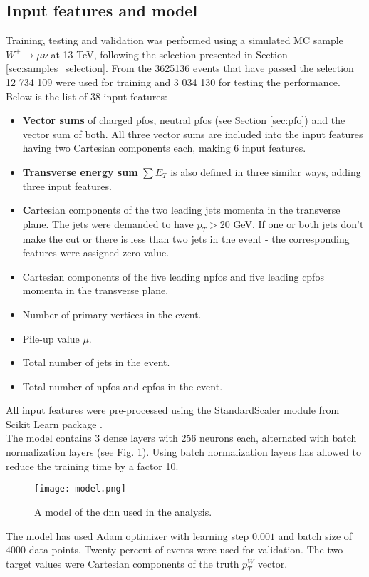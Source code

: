 \subsection{Input features and model}
 Training, testing and validation was performed using a simulated MC sample $W^+\rightarrow\mu\nu$ at 13 TeV, following the selection presented in Section \ref{sec:samples_selection}. From the 3625136 events that have passed the selection 12 734 109 were used for training and 3 034 130 for testing the performance. 
 Below is the list of 38 input features: 
 \begin{itemize}
 \item \textbf{Vector sums} of charged \gls{pfos}, neutral \gls{pfos} (see Section \ref{sec:pfo}) and the vector sum of both. All three vector sums are included into the input features having two Cartesian components each, making 6 input features. 
 \item \textbf{Transverse energy sum} $\sum E_T$ is also defined in three similar ways, adding three input features.
 \item \textbf Cartesian components of the {two leading jets} momenta in the transverse plane. The jets were demanded to have $p_T>20$ GeV. If one or both jets don't make the cut or there is less than two jets in the event - the corresponding features were assigned zero value. 
 \item Cartesian components of the {five leading \gls{npfos} and five leading \gls{cpfos}} momenta in the transverse plane. 
 \item Number of primary vertices in the event.
 \item Pile-up value $\mu$.
 \item Total number of jets in the event.
 \item Total number of \gls{npfos} and \gls{cpfos} in the event.
\end{itemize}
All input features were pre-processed using the StandardScaler module from Scikit Learn package \cite{scikit-learn}.\\
The model contains 3 dense layers with 256 neurons each, alternated with batch normalization layers (see Fig. \ref{fig::nnmodel}). Using batch normalization layers has allowed to reduce the training time by a factor 10. 
\begin{figure}[htpb]
	\centering
	\texttt{[image: model.png]}
	\caption{A model of the \gls{dnn} used in the analysis. }
	\label{fig::nnmodel}
\end{figure}
The model has used Adam optimizer with learning step $0.001$ and batch size of $4000$ data points. Twenty percent of events were used for validation. The two target values were Cartesian components of the truth $p_T^W$ vector. \\
